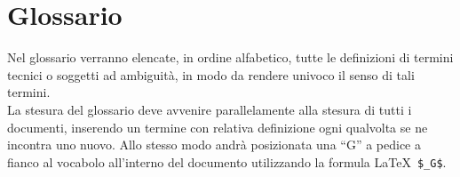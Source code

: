 \section{Glossario}
Nel glossario verranno elencate, in ordine alfabetico, tutte le definizioni di termini tecnici o soggetti ad ambiguità, in modo da rendere univoco il senso di tali termini. \\
La stesura del glossario deve avvenire parallelamente alla stesura di tutti i documenti, inserendo un termine con relativa definizione ogni qualvolta se ne incontra uno nuovo. Allo stesso modo andrà posizionata una ``G'' a pedice a fianco al vocabolo all'interno del documento utilizzando la formula \LaTeX\ \verb+$_G$+.